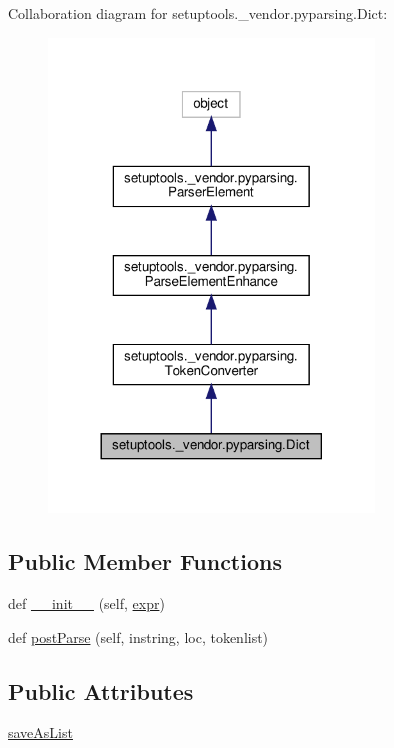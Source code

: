 Collaboration diagram for setuptools.\+\_\+vendor.\+pyparsing.\+Dict\+:
\nopagebreak
\begin{figure}[H]
\begin{center}
\leavevmode
\includegraphics[width=245pt]{classsetuptools_1_1__vendor_1_1pyparsing_1_1Dict__coll__graph}
\end{center}
\end{figure}
\subsection*{Public Member Functions}
\begin{DoxyCompactItemize}
\item 
def \hyperlink{classsetuptools_1_1__vendor_1_1pyparsing_1_1Dict_a7b96a2cdf8381779910b2c41b782a5a2}{\+\_\+\+\_\+init\+\_\+\+\_\+} (self, \hyperlink{classsetuptools_1_1__vendor_1_1pyparsing_1_1ParseElementEnhance_a445450bd765a74cc1d1567e40cade40d}{expr})
\item 
def \hyperlink{classsetuptools_1_1__vendor_1_1pyparsing_1_1Dict_a22a8dfcf1dca19517641cb9590e1683d}{post\+Parse} (self, instring, loc, tokenlist)
\end{DoxyCompactItemize}
\subsection*{Public Attributes}
\begin{DoxyCompactItemize}
\item 
\hyperlink{classsetuptools_1_1__vendor_1_1pyparsing_1_1Dict_ae7582c1907de5c66fdced28823a533a0}{save\+As\+List}
\end{DoxyCompactItemize}
